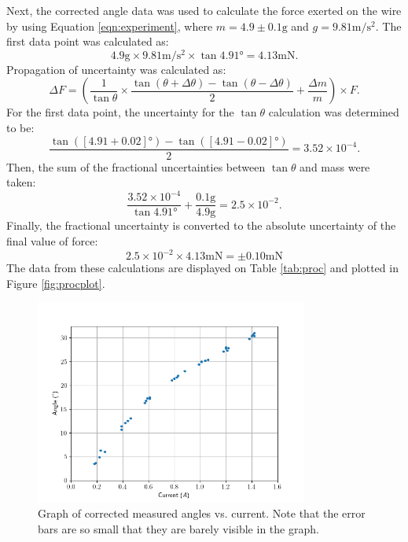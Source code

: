 Next, the corrected angle data was used to calculate the force exerted on the wire by using Equation \eqref{eqn:experiment}, where $m = 4.9\pm0.1\si{\gram}$ and $g = 9.81\si{\meter\per\second\squared}$. The first data point was calculated as:
\begin{equation*}
	4.9\si{\gram} \times 9.81\si{\meter\per\second\squared} \times \tan 4.91\si{\degree} = 4.13\si{\milli\newton} \text{.}
\end{equation*}
Propagation of uncertainty was calculated as:
\begin{equation*}
	\Delta F = \left( \frac{1}{\tan\theta} \times \frac{\tan(\theta + \Delta\theta) - \tan(\theta - \Delta\theta)}{2} + \frac{\Delta m}{m} \right) \times F \text{.}
\end{equation*}
For the first data point, the uncertainty for the $\tan\theta$ calculation was determined to be:
\begin{equation*}
	\frac{\tan([4.91 + 0.02]\si{\degree}) - \tan([4.91 - 0.02]\si{\degree})}{2} = 3.52\times10^{-4} \text{.}
\end{equation*}
Then, the sum of the fractional uncertainties between $\tan\theta$ and mass were taken:
\begin{equation*}
	\frac{3.52\times10^{-4}}{\tan 4.91\si{\degree}} + \frac{0.1\si{\gram}}{4.9\si{\gram}} = 2.5\times10^{-2} \text{.}
\end{equation*}
Finally, the fractional uncertainty is converted to the absolute uncertainty of the final value of force:
\begin{equation*}
	2.5\times10^{-2} \times 4.13\si{\milli\newton} = \pm 0.10\si{\milli\newton}
\end{equation*}
The data from these calculations are displayed on Table \ref{tab:proc} and plotted in Figure \ref{fig:procplot}.

\begin{figure}[t!]
	\centering
	\includegraphics[width=0.8\textwidth]{figures/rawplot.png}
	\caption{Graph of corrected measured angles vs. current. Note that the error bars are so small that they are barely visible in the graph.}
	\label{fig:rawplot}
\end{figure}

